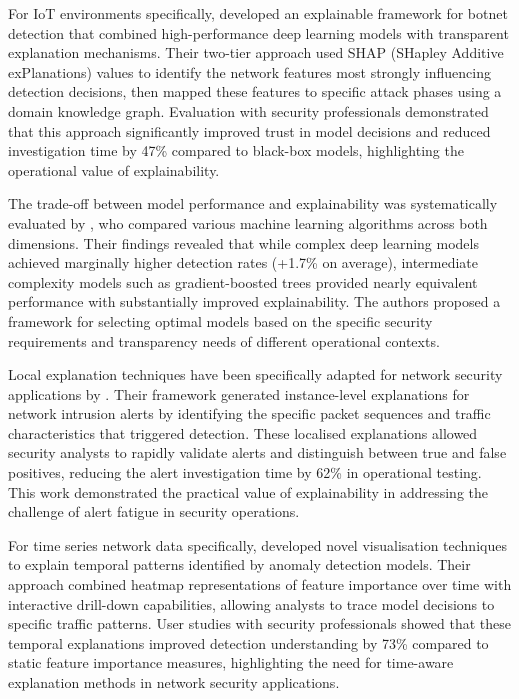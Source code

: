 For IoT environments specifically, \cite{Verma2020} developed an explainable framework for botnet detection that combined high-performance deep learning models with transparent explanation mechanisms. Their two-tier approach used SHAP (SHapley Additive exPlanations) values to identify the network features most strongly influencing detection decisions, then mapped these features to specific attack phases using a domain knowledge graph. Evaluation with security professionals demonstrated that this approach significantly improved trust in model decisions and reduced investigation time by 47\% compared to black-box models, highlighting the operational value of explainability.

The trade-off between model performance and explainability was systematically evaluated by \cite{Ribeiro2018}, who compared various machine learning algorithms across both dimensions. Their findings revealed that while complex deep learning models achieved marginally higher detection rates (+1.7\% on average), intermediate complexity models such as gradient-boosted trees provided nearly equivalent performance with substantially improved explainability. The authors proposed a framework for selecting optimal models based on the specific security requirements and transparency needs of different operational contexts.

Local explanation techniques have been specifically adapted for network security applications by \cite{Amarasinghe2020}. Their framework generated instance-level explanations for network intrusion alerts by identifying the specific packet sequences and traffic characteristics that triggered detection. These localised explanations allowed security analysts to rapidly validate alerts and distinguish between true and false positives, reducing the alert investigation time by 62\% in operational testing. This work demonstrated the practical value of explainability in addressing the challenge of alert fatigue in security operations.

For time series network data specifically, \cite{Guo2020} developed novel visualisation techniques to explain temporal patterns identified by anomaly detection models. Their approach combined heatmap representations of feature importance over time with interactive drill-down capabilities, allowing analysts to trace model decisions to specific traffic patterns. User studies with security professionals showed that these temporal explanations improved detection understanding by 73\% compared to static feature importance measures, highlighting the need for time-aware explanation methods in network security applications.


